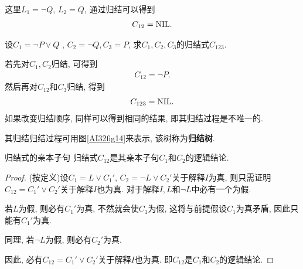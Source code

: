 \begin{result}
    这里$L_1=\neg Q$, $L_2=Q$, 通过归结可以得到
\begin{align}
    C_{12}= \textup{NIL}.
\end{align}
\end{result}
\begin{example}
    设$C_1  =\neg P \vee  Q$ , $C_2 =\neg Q,C_3=P$, 求$C_1,C_2 ,C_3$的归结式$C_{123}$.
\end{example}
\begin{result}
若先对$C_1,C_2$归结, 可得到
\begin{align}
    C_{1 2}=\neg P.
\end{align}
然后再对$C_{12}$和$C_3$归结, 得到
\begin{align}
    C_{123}=\textup{NIL}.
\end{align}
如果改变归结顺序, 同样可以得到相同的结果, 即其归结过程是不唯一的.
\end{result}

其归结归结过程可用图\ref{AI32fig14}来表示, 该树称为\textbf{归结树}.
\begin{mythm}{归结式的亲本子句}{}\label{AIthm3.1}
    归结式$C_{12}$是其亲本子句$C_1 $和$C_2$的逻辑结论.
\end{mythm}
\begin{proof}
(按定义)设$C_1 =L\vee C_1 '$, $C_2 =\neg L\vee C_2 '$关于解释$I$为真, 则只需证明$C_{1 2}= C_1' \vee C_2 '$关于解释$I$也为真.
对于解释$I, L$和$\neg L$中必有一个为假.

若$L$为假, 则必有$C_1'$为真, 不然就会使$C_1$为假, 这将与前提假设$C_1$为真矛盾, 因此只能有$C_1'$为真.

同理, 若$\neg L$为假, 则必有$C_2'$为真.

因此, 必有$C_{1 2}= C_1 '\vee C_2 '$关于解释$I$也为真. 即$C_{12}$是$C_1$和$C_2$的逻辑结论.
\end{proof}

